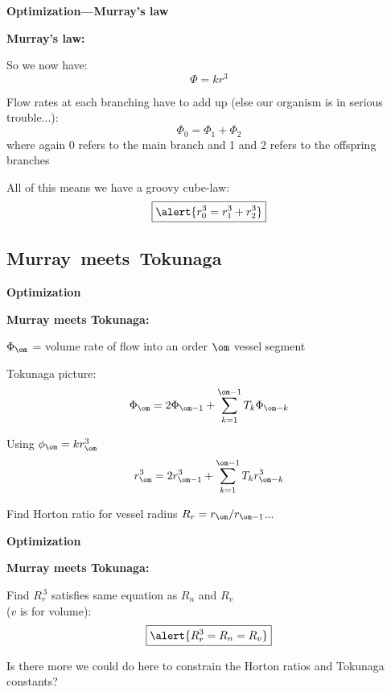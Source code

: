   



  \textbf{Optimization---Murray's law}

  \textbf{Murray's law:}
    
     So we now have:
      $$
      \Phi = k r^3 
      $$
     
      Flow rates at each branching have to add up
      (else our organism is in serious trouble...):
      $$
      \Phi_0 = \Phi_1 + \Phi_2
      $$
      where again 0 refers to the  main branch and 1 and 2 refers
      to the offspring branches
    
      All of this means we have a groovy cube-law:
      $$ 
      \boxed{\alert{r_0^3 = r_1^3 + r_2^3}}
      $$
      
    
  


\subsection{Murray\ meets\ Tokunaga}


  \textbf{Optimization}

  \textbf{Murray meets Tokunaga:}
    
     
      $\Phi_\om$ = volume rate of flow into an order
      $\om$ vessel segment
     
      Tokunaga picture:
      $$ 
      \Phi_\om
      = 
      2 \Phi_{\om - 1}
      +
      \sum_{k=1}^{\om-1}
      T_k
      \Phi_{\om-k}
      $$
    
      Using $\phi_\om = k r_{\om}^{3}$
      $$
      r_\om^3
      = 
      2 r_{\om - 1}^{3}
      +
      \sum_{k=1}^{\om-1}
      T_k
      r_{\om-k}^{3}
      $$
    
      Find Horton ratio for vessel radius $R_r = r_{\om}/r_{\om-1}$...
    
  



  \textbf{Optimization}

  \textbf{Murray meets Tokunaga:}
    
     
      Find $R_r^{\, 3}$ satisfies same equation as $R_n$ and $R_v$\\
      ($v$ is for volume):
      $$
      \boxed{ \alert{R_r^3 = R_n = R_v} }
      $$
    
      Is there more we could do here to constrain the Horton
      ratios and Tokunaga constants?
    
  



